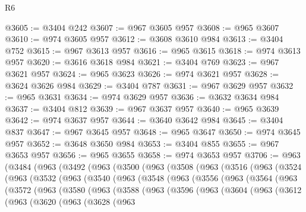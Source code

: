 \begin{lexlean}{R6}
\begin{coremodule}
@3605 := @3404 @242
@3607 := @967 @3605 @957
@3608 := @965 @3607
@3610 := @974 @3605 @957
@3612 := @3608 @3610 @984
@3613 := @3404 @752
@3615 := @967 @3613 @957
@3616 := @965 @3615
@3618 := @974 @3613 @957
@3620 := @3616 @3618 @984
@3621 := @3404 @769
@3623 := @967 @3621 @957
@3624 := @965 @3623
@3626 := @974 @3621 @957
@3628 := @3624 @3626 @984
@3629 := @3404 @787
@3631 := @967 @3629 @957
@3632 := @965 @3631
@3634 := @974 @3629 @957
@3636 := @3632 @3634 @984
@3637 := @3404 @812
@3639 := @967 @3637 @957
@3640 := @965 @3639
@3642 := @974 @3637 @957
@3644 := @3640 @3642 @984
@3645 := @3404 @837
@3647 := @967 @3645 @957
@3648 := @965 @3647
@3650 := @974 @3645 @957
@3652 := @3648 @3650 @984
@3653 := @3404 @855
@3655 := @967 @3653 @957
@3656 := @965 @3655
@3658 := @974 @3653 @957
@3706 := @963
    (@3484
      (@963
        (@3492
          (@963
            (@3500
              (@963
                (@3508
                  (@963
                    (@3516
                      (@963
                        (@3524
                          (@963
                            (@3532
                              (@963
                                (@3540
                                  (@963
                                    (@3548
                                      (@963
                                        (@3556
                                          (@963
                                            (@3564
                                              (@963
                                                (@3572
                                                  (@963
                                                    (@3580
                                                      (@963
                                                        (@3588
                                                          (@963
                                                            (@3596
                                                              (@963
                                                                (@3604
                                                                  (@963
                                                                    (@3612
                                                                      (@963
                                                                        (@3620
                                                                          (@963
                                                                            (@3628
                                                                              (@963

\end{coremodule}
\end{lexlean}
